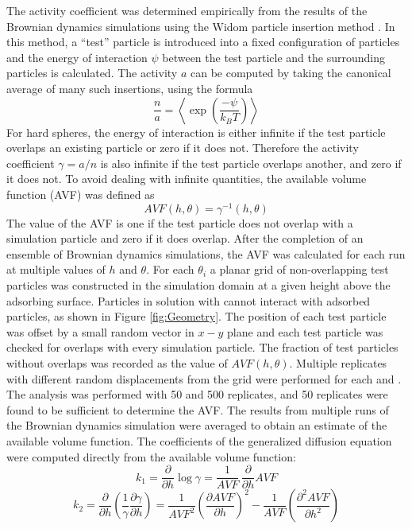 The activity coefficient was determined empirically from the results
of the Brownian dynamics simulations using the Widom particle insertion
method \cite{Widom1963}. In this method, a {}``test'' particle
is introduced into a fixed configuration of particles and the energy
of interaction $\psi$ between the test particle and the surrounding
particles is calculated. The activity $a$ can be computed by taking
the canonical average of many such insertions, using the formula\[
\frac{n}{a}=\left\langle \exp\left(\frac{-\psi}{k_{B}T}\right)\right\rangle \]
For hard spheres, the energy of interaction is either infinite if
the test particle overlaps an existing particle or zero if it does
not. Therefore the activity coefficient $\gamma=a/n$ is also infinite
if the test particle overlaps another, and zero if it does not. To
avoid dealing with infinite quantities, the available volume function
(AVF) was defined as \[
AVF\left(h,\theta\right)=\gamma^{-1}\left(h,\theta\right)\]
The value of the AVF is one if the test particle does not overlap
with a simulation particle and zero if it does overlap. After the
completion of an ensemble of Brownian dynamics simulations, the AVF
was calculated for each run at multiple values of $h$ and $\theta$.
For each $\theta_{i}$ a planar grid of non-overlapping test particles
was constructed in the simulation domain at a given height above the
adsorbing surface. Particles in solution with cannot interact with
adsorbed particles, as shown in Figure \ref{fig:Geometry}. The position
of each test particle was offset by a small random vector in $x-y$
plane and each test particle was checked for overlaps with every simulation
particle. The fraction of test particles without overlaps was recorded
as the value of $AVF\left(h,\theta\right)$. Multiple replicates with
different random displacements from the grid were performed for each
and . The analysis was performed with 50 and 500 replicates, and 50
replicates were found to be sufficient to determine the AVF. The results
from multiple runs of the Brownian dynamics simulation were averaged
to obtain an estimate of the available volume function. The coefficients
of the generalized diffusion equation were computed directly from
the available volume function:\[
k_{1}=\frac{\partial}{\partial h}\log\gamma=\frac{1}{AVF}\,\frac{\partial}{\partial h}AVF\]
\[
k_{2}=\frac{\partial}{\partial h}\left(\frac{1}{\gamma}\frac{\partial\gamma}{\partial h}\right)=\frac{1}{AVF^{2}}\left(\frac{\partial AVF}{\partial h}\right)^{2}-\frac{1}{AVF}\left(\frac{\partial^{2}AVF}{\partial h^{2}}\right)\]




